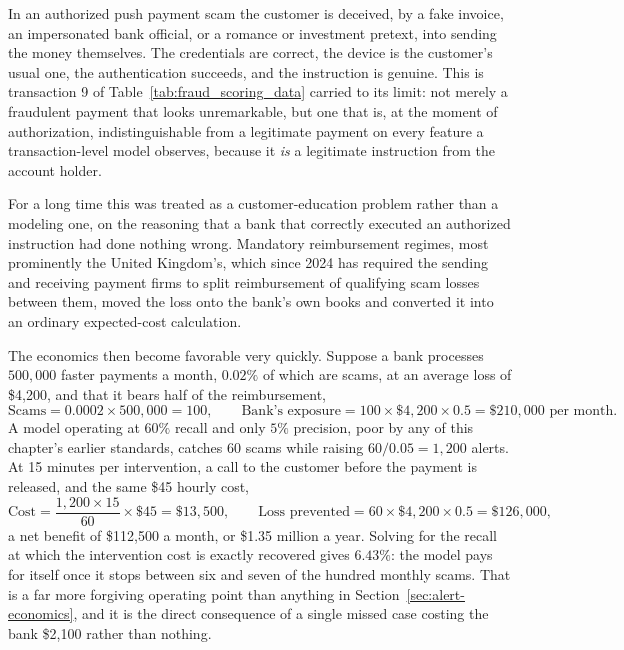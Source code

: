 \documentclass[../ai_in_finance]{subfiles}
\begin{document}
In an authorized push payment scam the customer is deceived, by a fake invoice, an impersonated bank official, or a romance or investment pretext, into sending the money themselves. The credentials are correct, the device is the customer's usual one, the authentication succeeds, and the instruction is genuine. This is transaction 9 of Table~\ref{tab:fraud_scoring_data} carried to its limit: not merely a fraudulent payment that looks unremarkable, but one that is, at the moment of authorization, indistinguishable from a legitimate payment on every feature a transaction-level model observes, because it \emph{is} a legitimate instruction from the account holder.

For a long time this was treated as a customer-education problem rather than a modeling one, on the reasoning that a bank that correctly executed an authorized instruction had done nothing wrong. Mandatory reimbursement regimes, most prominently the United Kingdom's, which since 2024 has required the sending and receiving payment firms to split reimbursement of qualifying scam losses between them, moved the loss onto the bank's own books and converted it into an ordinary expected-cost calculation.

The economics then become favorable very quickly. Suppose a bank processes $500{,}000$ faster payments a month, $0.02\%$ of which are scams, at an average loss of \$4,200, and that it bears half of the reimbursement,
\begin{equation*}
\text{Scams} = 0.0002 \times 500{,}000 = 100, \qquad \text{Bank's exposure} = 100 \times \$4{,}200 \times 0.5 = \$210{,}000 \text{ per month}.
\end{equation*}
A model operating at $60\%$ recall and only $5\%$ precision, poor by any of this chapter's earlier standards, catches 60 scams while raising $60/0.05 = 1{,}200$ alerts. At 15 minutes per intervention, a call to the customer before the payment is released, and the same \$45 hourly cost,
\begin{equation*}
\text{Cost} = \frac{1{,}200 \times 15}{60} \times \$45 = \$13{,}500, \qquad \text{Loss prevented} = 60 \times \$4{,}200 \times 0.5 = \$126{,}000,
\end{equation*}
a net benefit of \$112,500 a month, or \$1.35 million a year. Solving for the recall at which the intervention cost is exactly recovered gives $6.43\%$: the model pays for itself once it stops between six and seven of the hundred monthly scams. That is a far more forgiving operating point than anything in Section~\ref{sec:alert-economics}, and it is the direct consequence of a single missed case costing the bank \$2,100 rather than nothing.
\end{document}
